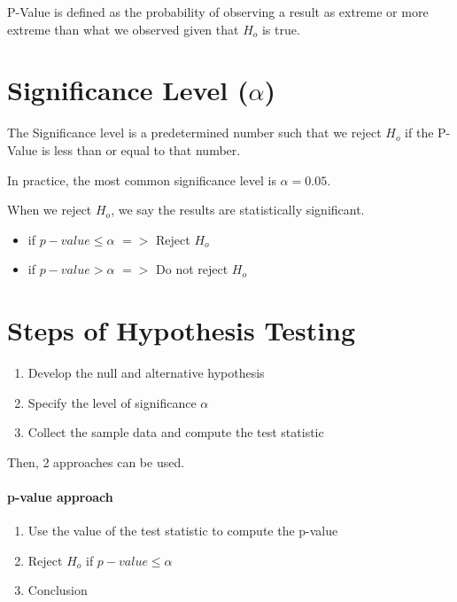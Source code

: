 \documentclass{article}
\begin{document}
    P-Value is defined as the probability of observing a result as extreme 
    or more extreme than what we observed given that $H_{o}$ is true.

    \section*{Significance Level ($\alpha$)}
    The Significance level is a predetermined number such that we reject $H_{o}$ if the P-Value 
    is less than or equal to that number.\par

    In practice, the most common significance level is $\alpha = 0.05$.\par

    When we reject $H_{o}$, we say the results are statistically significant.

    \begin{itemize}
        \item if $p-value \leq \alpha$ $=>$ Reject $H_{o}$
        \item if $p-value > \alpha$ $=>$ Do not reject $H_{o}$
    \end{itemize}

    \section*{Steps of Hypothesis Testing}
        \begin{enumerate}
            \item Develop the null and alternative hypothesis
            \item Specify the level of significance $\alpha$
            \item Collect the sample data and compute the test statistic
        \end{enumerate}

        Then, 2 approaches can be used.
        \paragraph*{p-value approach}
        \begin{enumerate}
            \item Use the value of the test statistic to compute the p-value
            \item Reject $H_{o}$ if $p-value \leq \alpha$
            \item Conclusion
        \end{enumerate}
\end{document}
